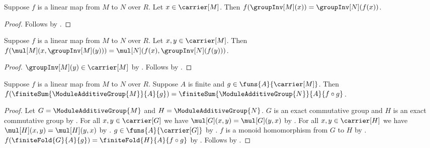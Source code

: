 \begin{theorem}\label{linear_map_negation}
    Suppose $f$ is a linear map from $M$ to $N$ over $R$.
    Let $x\in\carrier[M]$.
    Then $f(\groupInv[M](x))=\groupInv[N](f(x))$.
\end{theorem}
\begin{proof}
    Follows by
        .
\end{proof}

\begin{theorem}\label{linear_map_subtraction}
    Suppose $f$ is a linear map from $M$ to $N$ over $R$.
    Let $x,y\in\carrier[M]$.
    Then
        $f(\mul[M](x,\groupInv[M](y)))
            =\mul[N](f(x),\groupInv[N](f(y)))$.
\end{theorem}
\begin{proof}
    $\groupInv[M](y)\in\carrier[M]$ by
        .
    Follows by .
\end{proof}

\begin{theorem}\label{linear_map_finite_sum}
    Suppose $f$ is a linear map from $M$ to $N$ over $R$.
    Suppose $A$ is finite and $g\in\funs{A}{\carrier[M]}$.
    Then
        $f(\finiteSum{\ModuleAdditiveGroup{M}}{A}{g})
            =\finiteSum{\ModuleAdditiveGroup{N}}{A}{f\circ g}$.
\end{theorem}
\begin{proof}
    Let $G=\ModuleAdditiveGroup{M}$ and
        $H=\ModuleAdditiveGroup{N}$.
    $G$ is an exact commutative group and
        $H$ is an exact commutative group by
        .
    For all $x,y\in\carrier[G]$ we have
        $\mul[G](x,y)=\mul[G](y,x)$ by
        .
    For all $x,y\in\carrier[H]$ we have
        $\mul[H](x,y)=\mul[H](y,x)$ by
        .
    $g\in\funs{A}{\carrier[G]}$ by
        .
    $f$ is a monoid homomorphism from $G$ to $H$ by
        .
    $f(\finiteFold{G}{A}{g})
        =\finiteFold{H}{A}{f\circ g}$ by
        .
    Follows by .
\end{proof}

